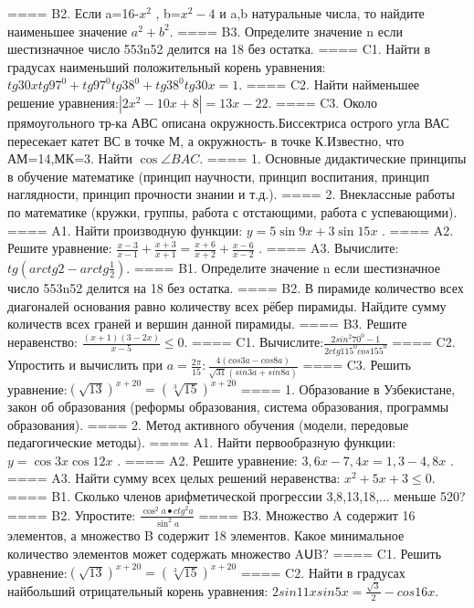 ====
B2. Если a=16-\(x^{2}\) , b=\(x^{2} - 4\) и a,b натуральные числа, то найдите наименьшее значение \(a^{2} + b^{2}\).
====
B3. Определите значение n если шестизначное число 553n52 делится на 18 без остатка.
====
C1. Найти в градусах наименьший положительный корень уравнения: \(tg30xtg97^{0} + tg97^{0}tg38^{0} + tg38^{0}tg30x = 1\).
====
C2. Найти найменьшее решение уравнения:\(\left| 2x^{2} - 10x + 8 \right| = 13x - 22\).
====
C3. Около прямоугольного тр-ка АВС описана окружность.Биссектриса острого угла ВАС пересекает катет ВС в точке М, а окружность- в точке К.Известно, что АМ=14,МК=3. Найти \(\cos\angle BAC\).
====
1. Основные дидактические принципы в обучение математике (принцип научности, принцип воспитания, принцип наглядности, принцип прочности знании и т.д.).
====
2. Внеклассные работы по математике (кружки, группы, работа с отстающими, работа с успевающими).
====
A1. Найти производную функции: \(y = 5\sin{9x} + 3\sin{15x}\) .
====
A2. Решите уравнение: \(\frac{x - 3}{x - 1} + \frac{x + 3}{x + 1} = \frac{x + 6}{x + 2} + \frac{x - 6}{x - 2}\) .
====
A3. Вычислите: \(tg\left( arctg2 - arctg\frac{1}{2} \right)\).
====
B1. Определите значение n если шестизначное число 553n52 делится на 18 без остатка.
====
B2. В пирамиде количество всех диагоналей основания равно количеству всех рёбер пирамиды. Найдите сумму количеств всех граней и вершин данной пирамиды.
====
B3. Решите неравенство: \(\frac{(x + 1)(3 - 2x)}{x - 5} \leq 0\).
====
C1. Вычислите:\(\frac{2sin^{2}70^{0} - 1}{2ctg115^{0}cos155^{0}}\)
====
C2. Упростить и вычислить при \(a = \frac{2\pi}{15}:\frac{4(cos3a - cos8a)}{\sqrt{31}(sin3a + sin8a)}\)
====
C3. Решить уравнение:\((\sqrt{13})^{x + 20} = (\sqrt[3]{15})^{x + 20}\)
====
1. Образование в Узбекистане, закон об образования (реформы образования, система образования, программы образования).
====
2. Метод активного обучения (модели, передовые педагогические методы).
====
A1. Найти первообразную функции: \(y = \cos{3x}\cos{12x}\) .
====
A2. Решите уравнение: \(3,6x - 7,4x = 1,3 - 4,8x\) .
====
A3. Найти сумму всех целых решений неравенства: \(x^{2} + 5x + 3 \leq 0\).
====
B1. Сколько членов арифметической прогрессии 3,8,13,18,... меньше 520?
====
B2. Упростите: \(\frac{\cos^{2}a \bullet {ctg}^{2}a}{\sin^{2}a}\)
====
B3. Множество A содержит 16 элементов, а множество B содержит 18 элементов. Какое минимальное количество элементов может содержать множество AՍB?
====
C1. Решить уравнение:\((\sqrt{13})^{x + 20} = (\sqrt[3]{15})^{x + 20}\)
====
C2. Найти в градусах найбольший отрицательный корень уравнения: \(2sin11xsin5x = \frac{\sqrt{3}}{2} - cos16x\).
